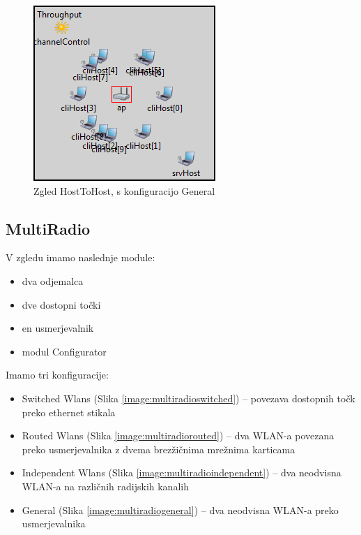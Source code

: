 \documentclass[a4paper,11pt]{article}
\begin{document}
\begin{figure}[htbp]
    \begin{center}
        \includegraphics[scale=0.8]{img/zgledi/hostohost_general.png}
        \caption{Zgled HostToHost, s konfiguracijo General}
        \label{image:hosttohostgeneral}
    \end{center}
\end{figure}


\subsection{MultiRadio}

V zgledu imamo naslednje module:

\begin{itemize}
    \item dva odjemalca
    \item dve dostopni točki
    \item en usmerjevalnik
    \item modul Configurator
\end{itemize}

Imamo tri konfiguracije:

\begin{itemize}
    \item Switched Wlans (Slika \ref{image:multiradioswitched}) – povezava dostopnih točk preko ethernet stikala
    \item Routed Wlans (Slika \ref{image:multiradiorouted}) – dva WLAN-a povezana preko usmerjevalnika z dvema brezžičnima mrežnima karticama
    \item Independent Wlans (Slika \ref{image:multiradioindependent}) – dva neodvisna WLAN-a na različnih radijskih kanalih
    \item General (Slika \ref{image:multiradiogeneral}) – dva neodvisna WLAN-a preko usmerjevalnika
\end{itemize}
\end{document}
